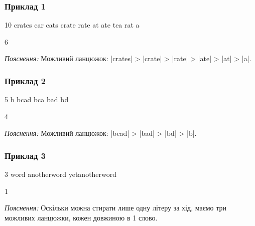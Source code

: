 \documentclass[12pt,a4paper]{article}
\begin{document}
\pagebreak


\subsubsection*{Приклад 1}

\textbf{}

\begin{codeblock}
10
crates
car
cats
crate
rate
at
ate
tea
rat
a
\end{codeblock}

\textbf{}

\begin{codeblock}
6
\end{codeblock}

\emph{Пояснення:} Можливий ланцюжок: |crates| > |crate| > |rate| > |ate| > |at| > |a|.


\subsubsection*{Приклад 2}

\textbf{}

\begin{codeblock}
5
b
bcad
bca
bad
bd
\end{codeblock}

\textbf{}

\begin{codeblock}
4
\end{codeblock}

\emph{Пояснення:} Можливий ланцюжок: |bcad| > |bad| > |bd| > |b|.


\subsubsection*{Приклад 3}

\textbf{}

\begin{codeblock}
3
word
anotherword
yetanotherword
\end{codeblock}

\textbf{}

\begin{codeblock}
1
\end{codeblock}

\emph{Пояснення:} Оскільки можна стирати лише одну літеру за хід, маємо три можливих ланцюжки, кожен довжиною в 1 слово.
\end{document}
